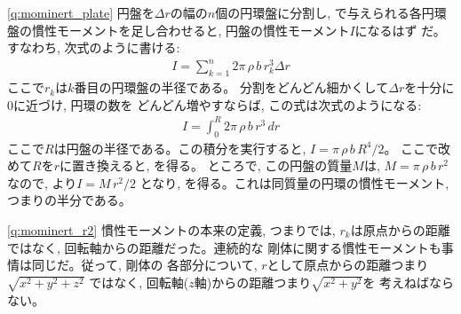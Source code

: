 \begin{q}
\ref{q:mominert_plate}
円盤を$\Delta r$の幅の$n$個の円環盤に分割し, 
で与えられる各円環盤の慣性モーメントを足し合わせると, 円盤の慣性モーメント$I$になるはず
だ。すなわち, 次式のように書ける:
\begin{eqnarray}
I=\sum_{k=1}^{n}2\pi\,\rho\,b\,r_k^3 \Delta r
\end{eqnarray}
ここで$r_k$は$k$番目の円環盤の半径である。
分割をどんどん細かくして$\Delta r$を十分に0に近づけ, 円環の数を
どんどん増やすならば, この式は次式のようになる: 
\begin{eqnarray}
I=\int_{0}^{R}2\pi\,\rho\,b\,r^3\,dr
\end{eqnarray}
ここで$R$は円盤の半径である。この積分を実行すると, 
$I=\pi\,\rho\,b\,R^4/2$。
ここで改めて$R$を$r$に置き換えると, を得る。
ところで, この円盤の質量$M$は, $M=\pi\,\rho\,b\,r^2$
なので, より$I=M\,r^2/2$
となり, を得る。これは同質量の円環の慣性モーメント, 
つまりの半分である。\mv

\ref{q:mominert_r2}
慣性モーメントの本来の定義, つまりでは, 
$r_k$は原点からの距離ではなく, 回転軸からの距離だった。連続的な
剛体に関する慣性モーメントも事情は同じだ。従って, 剛体の
各部分について, $r$として原点からの距離つまり$\sqrt{x^2+y^2+z^2}$
ではなく, 回転軸($z$軸)からの距離つまり$\sqrt{x^2+y^2}$を
考えねばならない。\mv


\end{q}
